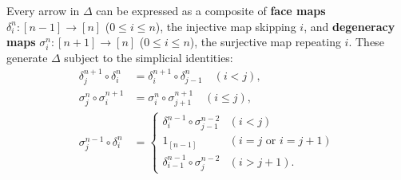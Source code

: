 Every arrow in $\Delta$ can be expressed as a composite of \textbf{face maps} $\delta_i^n: [n-1] \rightarrow [n]$ ($0 \leq i \leq n$), the injective map skipping $i$, and \textbf{degeneracy maps} $\sigma_i^n: [n+1] \rightarrow [n]$ ($0 \leq i \leq n$), the surjective map repeating $i$. These generate $\Delta$ subject to the simplicial identities:
\begin{align*}
\delta_j^{n+1} \circ \delta_i^n &= \delta_i^{n+1} \circ \delta_{j-1}^n \quad (i < j), \\
\sigma_j^n \circ \sigma_i^{n+1} &= \sigma_i^n \circ \sigma_{j+1}^{n+1} \quad (i \leq j), \\
\sigma_j^{n-1} \circ \delta_i^n &= \begin{cases}
\delta_i^{n-1} \circ \sigma_{j-1}^{n-2} & (i < j) \\
1_{[n-1]} & (i = j \text{ or } i = j+1) \\
\delta_{i-1}^{n-1} \circ \sigma_j^{n-2} & (i > j+1).
\end{cases}
\end{align*}